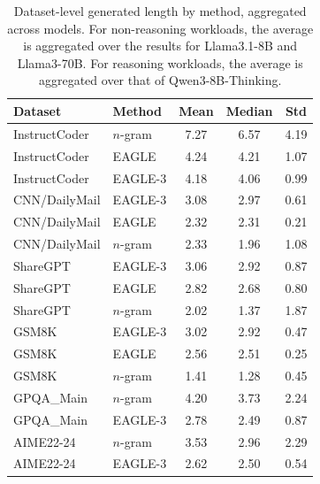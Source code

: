 \begin{table}[h!]
\centering
\begin{tabular}{llccc}
\toprule
Dataset & Method & Mean & Median & Std \\
\midrule
InstructCoder & $n$-gram & 7.27 & 6.57 & 4.19 \\
InstructCoder & EAGLE & 4.24 & 4.21 & 1.07 \\
InstructCoder & EAGLE-3 & 4.18 & 4.06 & 0.99 \\
CNN/DailyMail & EAGLE-3 & 3.08 & 2.97 & 0.61 \\
CNN/DailyMail & EAGLE & 2.32 & 2.31 & 0.21 \\
CNN/DailyMail & $n$-gram & 2.33 & 1.96 & 1.08 \\
ShareGPT & EAGLE-3 & 3.06 & 2.92 & 0.87 \\
ShareGPT & EAGLE & 2.82 & 2.68 & 0.80 \\
ShareGPT & $n$-gram & 2.02 & 1.37 & 1.87 \\
GSM8K & EAGLE-3 & 3.02 & 2.92 & 0.47 \\
GSM8K & EAGLE & 2.56 & 2.51 & 0.25 \\
GSM8K & $n$-gram & 1.41 & 1.28 & 0.45 \\
\midrule
GPQA\_Main & $n$-gram & 4.20 & 3.73 & 2.24 \\
GPQA\_Main & EAGLE-3 & 2.78 & 2.49 & 0.87 \\
AIME22-24 & $n$-gram & 3.53 & 2.96 & 2.29 \\
AIME22-24 & EAGLE-3 & 2.62 & 2.50 & 0.54 \\
\bottomrule
\end{tabular}
\caption{Dataset-level generated length by method, aggregated across models. For non-reasoning workloads, the average is aggregated over the results for Llama3.1-8B and Llama3-70B. For reasoning workloads, the average is aggregated over that of Qwen3-8B-Thinking.}
\label{tab:dataset_agg_by_method}
\end{table}

\clearpage

